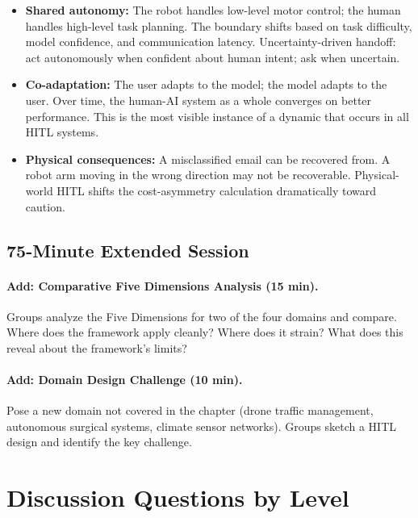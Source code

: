 \begin{itemize}
    \item \textbf{Shared autonomy:} The robot handles low-level motor control; the human handles high-level task planning. The boundary shifts based on task difficulty, model confidence, and communication latency. Uncertainty-driven handoff: act autonomously when confident about human intent; ask when uncertain.

    \item \textbf{Co-adaptation:} The user adapts to the model; the model adapts to the user. Over time, the human-AI system as a whole converges on better performance. This is the most visible instance of a dynamic that occurs in all HITL systems.

    \item \textbf{Physical consequences:} A misclassified email can be recovered from. A robot arm moving in the wrong direction may not be recoverable. Physical-world HITL shifts the cost-asymmetry calculation dramatically toward caution.
\end{itemize}

\subsection{75-Minute Extended Session}

\paragraph{Add: Comparative Five Dimensions Analysis (15 min).}
Groups analyze the Five Dimensions for two of the four domains and compare. Where does the framework apply cleanly? Where does it strain? What does this reveal about the framework's limits?

\paragraph{Add: Domain Design Challenge (10 min).}
Pose a new domain not covered in the chapter (drone traffic management, autonomous surgical systems, climate sensor networks). Groups sketch a HITL design and identify the key challenge.

\section{Discussion Questions by Level}

